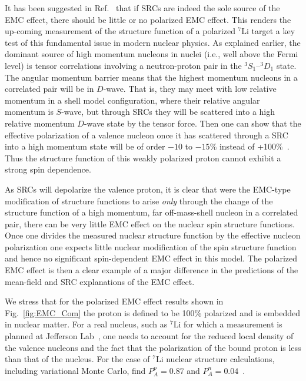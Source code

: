 It has been suggested in Ref.~\cite{Thomas:2018kcx} that if SRCs are indeed the sole source of the EMC effect, there should be little or no polarized EMC effect. This renders the up-coming measurement of the structure function of a polarized $^7$Li target a key test of this fundamental issue in modern nuclear physics. As explained earlier, the dominant source of high momentum nucleons in nuclei (i.e., well above the Fermi level) is tensor correlations involving a neutron-proton pair in the $^3S_1$--$^3D_1$ state. The angular momentum barrier means that the highest momentum nucleons in a correlated pair will be in $D$-wave. That is, they may meet with low relative momentum in a shell model configuration, where their relative angular momentum is $S$-wave, but through SRCs they will be scattered into a high relative momentum $D$-wave state by the tensor force. Then one can show that the effective polarization of a valence nucleon once it has scattered through a SRC into a high momentum state will be of order $-10$ to $-15$\% instead of +100\%~\cite{Thomas:2018kcx}. Thus the structure function of this weakly polarized proton cannot exhibit a strong spin dependence. 

As SRCs will depolarize the valence proton, it is clear that were the EMC-type modification of structure functions to arise {\em only} through the change of the structure function of a high momentum, far off-mass-shell nucleon in a correlated pair, there can be very little EMC effect on the nuclear spin structure functions. Once one divides the measured nuclear structure function by the effective nucleon polarization one expects little nuclear modification of the spin structure function and hence no significant spin-dependent EMC effect in this model. The polarized EMC effect is then a clear example of a major difference in the predictions of the mean-field and SRC explanations of the EMC effect.

We stress that for the polarized EMC effect results shown in Fig.~\ref{fig:EMC_Com} the proton is defined to be 100\% polarized and is embedded in nuclear matter. For a real nucleus, such as $^7$Li for which a measurement is planned at Jefferson Lab~\cite{jlabspin}, one needs to account for the reduced local density of the valence nucleons and the fact that the polarization of the bound proton is less than that of the nucleus. For the case of $^7$Li nuclear structure calculations, including variational Monte Carlo, find $P_A^p = 0.87$ and $P_A^n = 0.04$~\cite{Pudliner:1997ck}.




